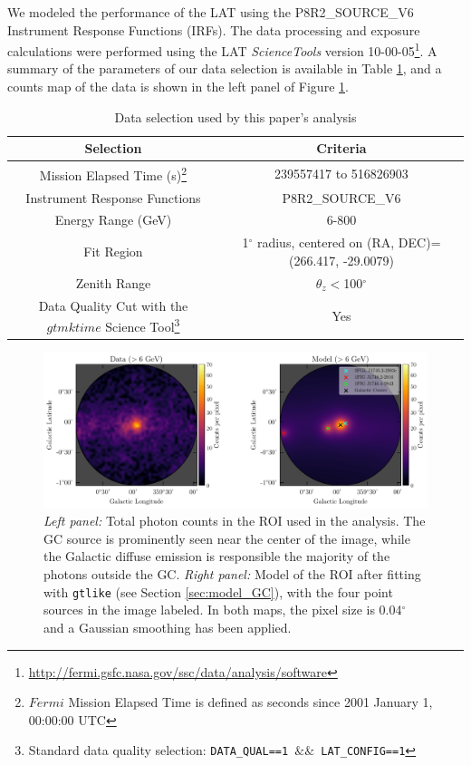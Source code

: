 We modeled the performance of the LAT using the {P8R2\_SOURCE\_V6} Instrument Response Functions (IRFs).
The data processing and exposure calculations were performed using the LAT \textit{ScienceTools} version 
10-00-05\footnote{\url{http://fermi.gsfc.nasa.gov/ssc/data/analysis/software}}. 
A summary of the parameters of our data selection is available in Table \ref{tab:data2}, and a counts map of the data is shown in the left panel of Figure \ref{fig:roi_residmap}.

\begin{table}[ht]
\begin{tabular}{cc}
\hline \hline
Selection & Criteria \\ \hline
Mission Elapsed Time (s)\footnote{$Fermi$ Mission Elapsed Time is defined as seconds since 2001 January 1, 00:00:00 UTC} & 239557417 to 516826903  \\ 
Instrument Response Functions & P8R2\_SOURCE\_V6 \\
Energy Range (GeV) & 6-800 \\
Fit Region & 1$^\circ$ radius, centered on (RA, DEC)=(266.417, -29.0079) \\ 
Zenith Range & $\theta_z<$100$^\circ$ \\
Data Quality Cut with the $gtmktime$ Science Tool\footnote{Standard data quality selection: \texttt{DATA\_QUAL==1 $\&\&$ LAT\_CONFIG==1}} &  Yes \\ \hline
\end{tabular}
\caption{ \label{tab:data2} Data selection used by this paper's analysis }
\end{table}

\begin{figure}[ht] 
\begin{center}
\includegraphics[width=0.9\columnwidth]{figures/dataModelComparison}
\noindent
\caption{ 
\label{fig:roi_residmap}
{\it Left panel:} Total photon counts in the ROI used in the analysis. The GC source is prominently seen near the center of the image, while the Galactic diffuse emission is responsible the majority of the photons outside the GC. {\it Right panel:} Model of the ROI after fitting with {{\tt gtlike}} (see Section \ref{sec:model_GC}), with the four point sources in the image labeled. In both maps, the pixel size is 0.04$^\circ$ and a Gaussian smoothing has been applied.
}
\end{center}
\end{figure}

